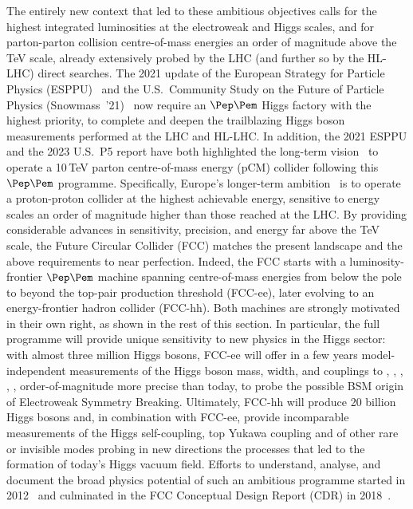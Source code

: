 The entirely new context that led to these ambitious objectives calls for the highest integrated luminosities at the electroweak and Higgs scales, and for parton-parton collision centre-of-mass energies an order of magnitude above the TeV scale, already extensively probed by the LHC (and further so by the HL-LHC) direct searches.
The 2021 update of the European Strategy for Particle Physics (ESPPU)~\cite{esppu} and the U.S.\ Community Study on the Future of Particle Physics (Snowmass~'21)~\cite{Butler:2023glv} now 
require an $\Pep\Pem$ Higgs factory with the highest priority, to complete and deepen the trailblazing Higgs boson measurements performed at the LHC and HL-LHC. 
In addition, the 2021 ESPPU and the 2023 U.S.\ P5 report have both highlighted the long-term vision~\cite{esppu,P5:2023wyd} to operate a 10\,TeV parton centre-of-mass energy (pCM) collider following this $\Pep\Pem$ programme. 
Specifically, Europe's longer-term ambition~\cite{esppu} is to operate a proton-proton collider at the highest achievable energy, sensitive to energy scales an order of magnitude higher than those reached at the LHC. 
By providing considerable advances in sensitivity, precision, and energy far above the TeV scale, the Future Circular Collider (FCC) matches the present landscape and the above requirements to near perfection. 
Indeed, the FCC starts with a luminosity-frontier $\Pep\Pem$ machine spanning centre-of-mass energies from below the \PZ pole to beyond the top-pair production threshold (FCC-ee), later evolving to an energy-frontier hadron collider (FCC-hh). 
Both machines are strongly motivated in their own right, as shown in the rest of this section.
In particular, the full programme will provide unique sensitivity to new physics in the Higgs sector: 
with almost three million Higgs bosons, FCC-ee will offer in a few years model-independent measurements of 
the Higgs boson mass, width, and couplings to \PZ, \PW, \Pgt, \PQb, \PQc, 
order-of-magnitude more precise than today, to probe the possible BSM origin of Electroweak Symmetry Breaking. 
Ultimately, FCC-hh will produce 20 billion Higgs bosons and, in combination with FCC-ee, provide incomparable measurements of the Higgs self-coupling, top Yukawa coupling and of other rare or invisible modes probing in new directions the processes that led to the formation of today’s Higgs vacuum field.
Efforts to understand, analyse, and document the broad physics potential of such an ambitious programme started in 2012~\cite{Gomez-Ceballos:2013zzn} and culminated in the FCC Conceptual Design Report (CDR) in 2018~\cite{fcc-phys-cdr, fcc-ee-cdr, FCC-hhCDR}. 

